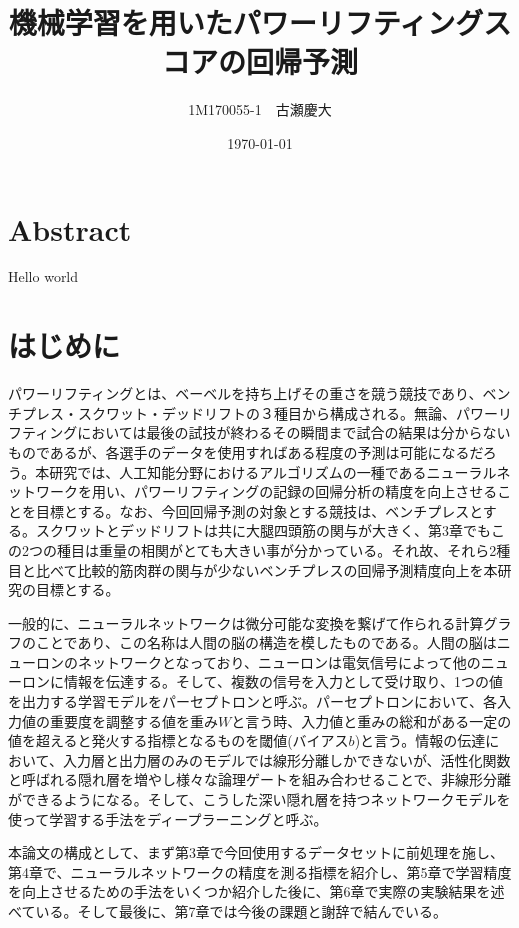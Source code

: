 \documentclass{report}
\title{機械学習を用いたパワーリフティングスコアの回帰予測}
\author{1M170055-1　古瀬慶大 }
\date{\today}
\begin{document}
\maketitle

\newpage

\section{Abstract}
Hello world


\newpage
\tableofcontents


\newpage
\section{はじめに}
パワーリフティングとは、ベーベルを持ち上げその重さを競う競技であり、ベンチプレス・スクワット・デッドリフトの３種目から構成される。無論、パワーリフティングにおいては最後の試技が終わるその瞬間まで試合の結果は分からないものであるが、各選手のデータを使用すればある程度の予測は可能になるだろう。本研究では、人工知能分野におけるアルゴリズムの一種であるニューラルネットワークを用い、パワーリフティングの記録の回帰分析の精度を向上させることを目標とする。なお、今回回帰予測の対象とする競技は、ベンチプレスとする。スクワットとデッドリフトは共に大腿四頭筋の関与が大きく、第3章でもこの2つの種目は重量の相関がとても大きい事が分かっている。それ故、それら2種目と比べて比較的筋肉群の関与が少ないベンチプレスの回帰予測精度向上を本研究の目標とする。

一般的に、ニューラルネットワークは微分可能な変換を繋げて作られる計算グラフのことであり、この名称は人間の脳の構造を模したものである。人間の脳はニューロンのネットワークとなっており、ニューロンは電気信号によって他のニューロンに情報を伝達する。そして、複数の信号を入力として受け取り、1つの値を出力する学習モデルをパーセプトロンと呼ぶ。パーセプトロンにおいて、各入力値の重要度を調整する値を重み\begin{math}W\end{math}と言う時、入力値と重みの総和がある一定の値を超えると発火する指標となるものを閾値(バイアス\begin{math}b\end{math})と言う。情報の伝達において、入力層と出力層のみのモデルでは線形分離しかできないが、活性化関数と呼ばれる隠れ層を増やし様々な論理ゲートを組み合わせることで、非線形分離ができるようになる。そして、こうした深い隠れ層を持つネットワークモデルを使って学習する手法をディープラーニングと呼ぶ。

本論文の構成として、まず第3章で今回使用するデータセットに前処理を施し、第4章で、ニューラルネットワークの精度を測る指標を紹介し、第5章で学習精度を向上させるための手法をいくつか紹介した後に、第6章で実際の実験結果を述べている。そして最後に、第7章では今後の課題と謝辞で結んでいる。
\end{document}
